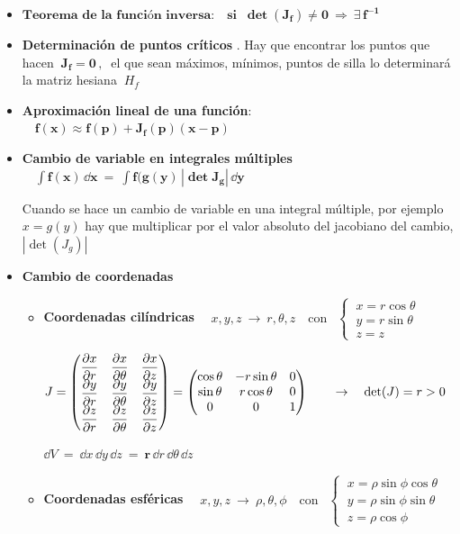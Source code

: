 \begin{itemize}
\item $\textbf{Teorema de la función inversa:} \quad \textbf{si } \ \boldsymbol{ \det(J_f) \neq 0 \ \Rightarrow \ \exists \, f^{-1} } $
\item \textbf{Determinación de puntos críticos} . Hay que encontrar los puntos que hacen $\ \boldsymbol {J_f=0} \, , \  $  el que sean máximos, mínimos, puntos de silla lo determinará la matriz hesiana $\ H_f$
\item \textbf{Aproximación lineal de una función}: $\quad \boldsymbol{ f(x) \approx f(p) + J_f(p)(x-p) }$
\item \textbf{Cambio de variable en integrales múltiples} $\quad \boldsymbol{\displaystyle \int f(x) \, \dd x \ = \ \int f(g(y) \, |\det J_g|\, \dd y}$

Cuando se hace un cambio de variable en una integral múltiple, por ejemplo $x=g(y)$ hay que multiplicar por el valor absoluto del jacobiano del cambio, $|\det(J_g)|$
\item \textbf{Cambio de coordenadas}
	\begin{itemize}
	\item \textbf{Coordenadas cilíndricas} $\quad x,y,z \ \to \ r,\theta, z \quad \text{con } \ \ \begin{cases} \ x=r\cos \theta \\ \ y=r\sin \theta \\ \ z=z \end{cases}$
	
	$J= \mqty(
	\displaystyle \pdv{x}{r} & \displaystyle \pdv{x}{\theta} & \displaystyle \pdv{x}{z} \\ 
	\displaystyle \pdv{y}{r} & \displaystyle \pdv{y}{\theta} & \displaystyle \pdv{y}{z} \\ 
	\displaystyle \pdv{z}{r} & \displaystyle \pdv{z}{\theta} & \displaystyle \pdv{z}{z} \\ 
	)= \mqty( \cos \theta & -r\sin \theta & 0 \\ \sin \theta & r\cos \theta & 0 \\ 0 & 0 & 1 ) \qquad \to \quad \det(J)=r>0$ 
	
	\hspace{5cm} $\dd V \ = \  \dd x \, \dd y\, \dd z \ = \  \boldsymbol r  \, \dd r \, \dd \theta \, \dd z$
	\item \textbf{Coordenadas esféricas} $\quad x,y,z \ \to \ \rho,\theta, \phi \quad \text{con } \ \ \begin{cases} \ x=\rho \sin \phi \cos \theta \\ \ y=\rho \sin \phi \sin \theta \\ \ z=\rho \cos \phi \end{cases}$
	

\end{itemize}
\end{itemize}
